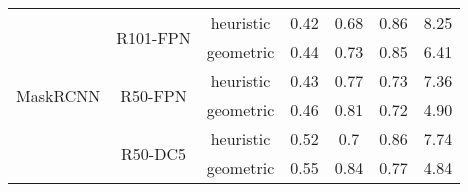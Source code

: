 \documentclass{\SetClass}
\begin{document}
\begin{table}[]
\begin{tabular}{c|c|c|c|c|c|c}
\multirow{6}{*}{MaskRCNN}  & \multirow{2}{*}{R101-FPN} & heuristic                                                          & 0.42                                                             & 0.68                                                           & 0.86            & 8.25                                                            \\
                          &                           & geometric                                                          & 0.44                                                             & 0.73                                                           & 0.85            & 6.41                                                            \\
                          & \multirow{2}{*}{R50-FPN}  & heuristic                                                          & 0.43                                                             & 0.77                                                           & 0.73            & 7.36                                                            \\
                          &                           & geometric                                                          & 0.46                                                             & 0.81                                                           & 0.72            & 4.90                                                            \\
                          & \multirow{2}{*}{R50-DC5}  & heuristic                                                          & 0.52                                                             & 0.7                                                            & 0.86            & 7.74                                                            \\
                          &                           & geometric                                                          & 0.55                                                             & 0.84                                                           & 0.77            & 4.84     \\                              
\bottomrule
\end{tabular}
\end{table}
\end{document}
